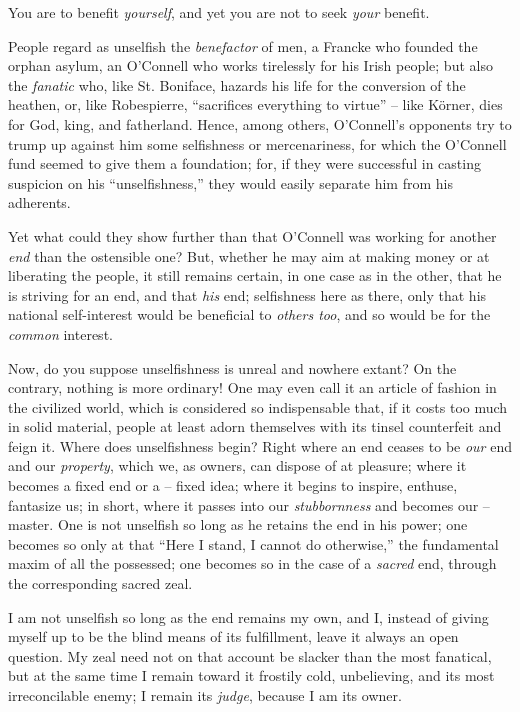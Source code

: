 \documentclass[12pt,a4paper]{book}
\begin{document}
You are to benefit \textit{yourself}, and yet you are not to seek 
\textit{your} benefit.

People regard as unselfish the \textit{benefactor} of men, a Francke who 
founded the orphan asylum, an O'Connell who works tirelessly for his Irish 
people; but also the \textit{fanatic} who, like St. Boniface, hazards his life 
for the conversion of the heathen, or, like Robespierre, ``sacrifices 
everything to virtue'' -- like K\"orner, dies for God, king, and fatherland. 
Hence, among others, O'Connell's opponents try to trump up against him some 
selfishness or mercenariness, for which the O'Connell fund seemed to give them 
a foundation; for, if they were successful in casting suspicion on his 
``unselfishness,'' they would easily separate him from his adherents.

Yet what could they show further than that O'Connell was working for another 
\textit{end} than the ostensible one? But, whether he may aim at making money 
or at liberating the people, it still remains certain, in one case as in the 
other, that he is striving for an end, and that \textit{his} end; selfishness 
here as there, only that his national self-interest would be beneficial to 
\textit{others too}, and so would be for the \textit{common} interest.

Now, do you suppose unselfishness is unreal and nowhere extant? On the 
contrary, nothing is more ordinary! One may even call it an article of fashion 
in the civilized world, which is considered so indispensable that, if it costs 
too much in solid material, people at least adorn themselves with its tinsel 
counterfeit and feign it. Where does unselfishness begin? Right where an end 
ceases to be \textit{our} end and our \textit{property}, which we, as owners, 
can dispose of at pleasure; where it becomes a fixed end or a -- fixed idea; 
where it begins to inspire, enthuse, fantasize us; in short, where it passes 
into our \textit{stubbornness} and becomes our -- master. One is not unselfish 
so long as he retains the end in his power; one becomes so only at that 
``Here I stand, I cannot do otherwise,'' the fundamental maxim of all the 
possessed; one becomes so in the case of a \textit{sacred} end, through the 
corresponding sacred zeal.

I am not unselfish so long as the end remains my own, and I, instead of giving 
myself up to be the blind means of its fulfillment, leave it always an open 
question. My zeal need not on that account be slacker than the most fanatical, 
but at the same time I remain toward it frostily cold, unbelieving, and its 
most irreconcilable enemy; I remain its \textit{judge}, because I am its 
owner.
\end{document}
